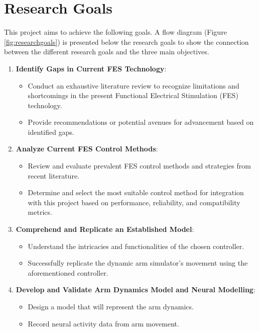 \section{Research Goals} \label{sec:reserachgoal}

This project aims to achieve the following goals. A flow diagram (Figure \ref{fig:researchgoals}) is presented below the research goals to show the connection between the different research goals and the three main objectives.

\begin{enumerate}

    \item \textbf{Identify Gaps in Current FES Technology}:
    \begin{itemize}
        \item Conduct an exhaustive literature review to recognize limitations and shortcomings in the present Functional Electrical Stimulation (FES) technology.
        \item Provide recommendations or potential avenues for advancement based on identified gaps.
    \end{itemize}
    
      \item \textbf{Analyze Current FES Control Methods}:
    \begin{itemize}
        \item Review and evaluate prevalent FES control methods and strategies from recent literature.
        \item Determine and select the most suitable control method for integration with this project based on performance, reliability, and compatibility metrics.
    \end{itemize}
    
    \item \textbf{Comprehend and Replicate an Established Model}:
    \begin{itemize}
        \item Understand the intricacies and functionalities of the chosen controller.
        \item Successfully replicate the dynamic arm simulator's movement using the aforementioned controller.
    \end{itemize}

    \item \textbf{Develop and Validate Arm Dynamics Model and Neural Modelling}:
    \begin{itemize}
        \item Design a model that will represent the arm dynamics.
        \item Record neural activity data from arm movement.
    \end{itemize}
    

\end{enumerate}
